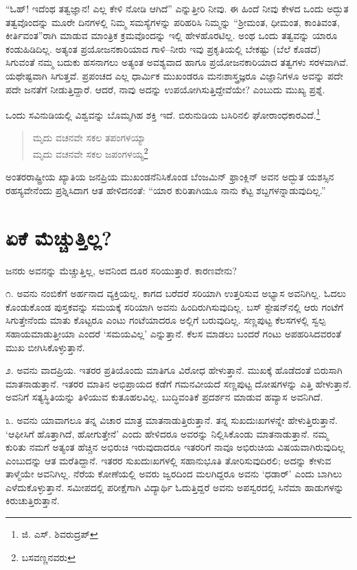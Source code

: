 “ಓಹ್​! ಇದೆಂಥ ತತ್ವಜ್ಞಾನ! ಎಲ್ಲ ಕೇಳಿ ನೋಡಿ ಆಗಿದೆ” ಎನ್ನುತ್ತೀರಿ ನೀವು. ಈ ಹಿಂದೆ ನೀವು ಕೇಳದ ಒಂದು ಅದ್ಭುತ ತತ್ವವೊಂದನ್ನು ಮೂರೇ ದಿನಗಳಲ್ಲಿ ನಿಮ್ಮ ಸಮಸ್ಯೆಗಳನ್ನು ಪರಿಹರಿಸಿ ನಿಮ್ಮನ್ನು “ಶ‍್ರೀಮಂತ, ಧೀಮಂತ, ಕಾಂತಿವಂತ, ಕೀರ್ತಿವಂತ”ರಾಗಿ ಮಾಡುವ ಮಾಂತ್ರಿಕ ಕ್ರಮವೊಂದನ್ನು ಇಲ್ಲಿ ಹೇಳಹೊರಟಿಲ್ಲ. ಅಂಥ ಒಂದು ತತ್ವವನ್ನು ಯಾರೂ ಕಂಡುಹಿಡಿದಿಲ್ಲ. ಅತ್ಯಂತ ಪ್ರಯೋಜನಕಾರಿಯಾದ ಗಾಳಿ–ನೀರು ಇವು ಪ್ರಕೃತಿಯಲ್ಲಿ ಬೇಕಷ್ಟು (ಬೆಲೆ ಕೊಡದೆ) ಸಿಗುವಂತೆ ನಮ್ಮ ಬದುಕು ಹಸನಾಗಲು ಅತ್ಯಂತ ಅವಶ್ಯವಾದ ಹಾಗೂ ಪ್ರಯೋಜನಕಾರಿಯಾದ ತತ್ವಗಳು ಸರಳವಾಗಿವೆ. ಯಥೇಷ್ಟವಾಗಿ ಸಿಗುತ್ತವೆ. ಪ್ರಪಂಚದ ಎಲ್ಲ ಧಾರ್ಮಿಕ ಮುಖಂಡರೂ ಮನಃಶಾಸ್ತ್ರಜ್ಞರೂ ವಿಜ್ಞಾನಿಗಳೂ ಅವನ್ನು ಪದೇ ಪದೇ ಜನತೆಗೆ ನೀಡುತ್ತಿದ್ದಾರೆ. ಆದರೆ, ನಾವು ಅದನ್ನು ಉಪಯೋಗಿಸುತ್ತಿದ್ದೇವೆಯೇ? ಎಂಬುದು ಮುಖ್ಯ ಪ್ರಶ್ನೆ.

ಒಂದು ಸವಿನುಡಿಯಲ್ಲಿ ವಿಶ್ವವನ್ನು ಬೊಮ್ಮಗಿಹ ಶಕ್ತಿ ಇದೆ. ಬಿರುನುಡಿಯ ಬಸಿರಿನಲಿ ಘೋರಾಂಧಕಾರವಿದೆ.\footnote{ಜಿ. ಎಸ್. ಶಿವರುದ್ರಪ್}

\begin{verse}
ಮೃದು ವಚನವೇ ಸಕಲ ತಪಂಗಳಯ್ಯಾ\\
 ಮೃದು ವಚನವೇ ಸಕಲ ಜಪಂಗಳಯ್ಯ\footnote{ಬಸವಣ್ಣನವರು}
\end{verse}

ಅಂತರರಾಷ್ಟ್ರೀಯ ಖ್ಯಾತಿಯ ಜನಪ್ರಿಯ ಮುಖಂಡನೆನಿಸಿಕೊಂಡ ಬೆಂಜಮಿನ್ ಫ್ರಾಂಕ್ಲಿನ್ ಅವನ ಅದ್ಭುತ ಯಶಸ್ಸಿನ ರಹಸ್ಯವೇನೆಂದು ಪ್ರಶ್ನಿಸಿದಾಗ ಆತ ಹೇಳಿದನಂತೆ: “ಯಾರ ಕುರಿ\-ತಾಗಿಯೂ ನಾನು ಕೆಟ್ಟ ಶಬ್ದಗಳನ್ನಾಡುವುದಿಲ್ಲ.”


\section*{ಏಕೆ ಮೆಚ್ಚುತ್ತಿಲ್ಲ?}


ಜನರು ಅವನನ್ನು ಮೆಚ್ಚುತ್ತಿಲ್ಲ, ಅವನಿಂದ ದೂರ ಸರಿಯುತ್ತಾರೆ. ಕಾರಣವೇನು?

೧. ಅವನು ನಂಬಿಕೆಗೆ ಅರ್ಹನಾದ ವ್ಯಕ್ತಿಯಲ್ಲ. ಕಾಗದ ಬರೆದರೆ ಸರಿಯಾಗಿ ಉತ್ತರಿಸುವ ಅಭ್ಯಾಸ ಅವನಿಗಿಲ್ಲ. ಓದಲು ಕೊಂಡುಕೊಂಡ ಪುಸ್ತಕವನ್ನು ಸಮಯಕ್ಕೆ ಸರಿಯಾಗಿ ಅವನು ಹಿಂದಿರುಗಿಸುವುದಿಲ್ಲ. ಬಸ್ ಸ್ಟೇಷನ್​ನಲ್ಲಿ ಆರು ಗಂಟೆಗೆ ಸಿಗುತ್ತೇನೆಂದು ಮಾತು ಕೊಟ್ಟರೂ ಎಂಟು ಗಂಟೆಯಾದರೂ ಅಲ್ಲಿಗೆ ಬರುವುದಿಲ್ಲ. ಸಣ್ಣಪುಟ್ಟ ಕೆಲಸಗಳಲ್ಲಿ ಸ್ವಲ್ಪ ಸಹಾಯ\break ಮಾಡುತ್ತೀಯಾ ಎಂದರೆ ‘ಸಮಯವಿಲ್ಲ’ ಎನ್ನುತ್ತಾನೆ. ಕೆಲಸ ಮಾಡಲು ಬಂದರೆ ಗಂಟು ಅಪಹರಿಸಿದವರಂತೆ ಮುಖ ಬೀಗಿಸಿಕೊಳ್ಳುತ್ತಾನೆ.

೨. ಅವನು ವಾದಪ್ರಿಯ. ಇತರರ ಪ್ರತಿಯೊಂದು ಮಾತಿಗೂ ವಿರೋಧ ಹೇಳುತ್ತಾನೆ. ಮುಖಕ್ಕೆ ಹೊಡೆದಂತೆ ಬಿರುಸಾಗಿ ಮಾತನಾಡುತ್ತಾನೆ. ಇತರರ ಮಾತಿನ ಅಭಿಪ್ರಾಯದ ಕಡೆಗೆ ಗಮನವೀಯದೆ ಸಣ್ಣಪುಟ್ಟ ದೋಷಗಳನ್ನು ಎತ್ತಿ ಹೇಳುತ್ತಾನೆ. ಅವನಿಗೆ ಸತ್ಯಸ್ಥಿತಿಯನ್ನು ತಿಳಿಯುವ ಕುತೂಹಲವಿಲ್ಲ. ಬುದ್ಧಿವಂತಿಕೆ ಪ್ರದರ್ಶನ ಮಾಡುವ ಹವ್ಯಾಸ ಅವನಿಗಿದೆ.

೩. ಅವನು ಯಾವಾಗಲೂ ತನ್ನ ವಿಚಾರ ಮಾತ್ರ ಮಾತನಾಡುತ್ತಿರುತ್ತಾನೆ. ತನ್ನ ಸುಖದುಃಖಗಳನ್ನೇ ಹೇಳುತ್ತಿರುತ್ತಾನೆ. ‘ಆಫೀಸಿಗೆ ಹೊತ್ತಾಗಿದೆ, ಹೋಗುತ್ತೇನೆ’ ಎಂದು ಹೇಳಿದರೂ ಅವರನ್ನು ನಿಲ್ಲಿಸಿಕೊಂಡು ಮಾತನಾಡುತ್ತಾನೆ. ನಮ್ಮ ಕುರಿತು ನಮಗೆ ಅತ್ಯಂತ ಹೆಚ್ಚಿನ ಅಭಿರುಚಿ ಇರುವು\-ದಾದರೂ ಇತರರಿಗೆ ನಾವೂ ಅಭಿರುಚಿಯ ವಿಷಯವಾಗಿರುವುದಿಲ್ಲ ಎಂಬುದನ್ನು ಆತ ಮರೆತಿ\-ದ್ದಾನೆ. ಇತರರ ಸುಖದುಃಖಗಳಲ್ಲಿ ಸಹಾನುಭೂತಿ ತೋರಿಸುವುದಿರಲಿ; ಅದನ್ನು ಕೇಳುವ ತಾಳ್ಮೆಯೇ ಅವನಿಗಿಲ್ಲ. ನೆರೆಯ ಕೋಣೆಯಲ್ಲಿ ಅವರು ಜ್ವರದಿಂದ ಮಲಗಿದ್ದರೂ ಅವನು ‘ಧಡಾರ್​’ ಎಂದು ಬಾಗಿಲು ಎಳೆದುಕೊಳ್ಳುತ್ತಾನೆ. ಸಮೀಪದಲ್ಲಿ ಪರೀಕ್ಷೆಗಾಗಿ ವಿದ್ಯಾರ್ಥಿ ಓದುತ್ತಿದ್ದರೆ ಅವನು ಅಪಸ್ವರದಲ್ಲಿ ಸಿನೆಮಾ ಹಾಡುಗಳನ್ನು ಕಿರುಚುತ್ತಿರುತ್ತಾನೆ.

